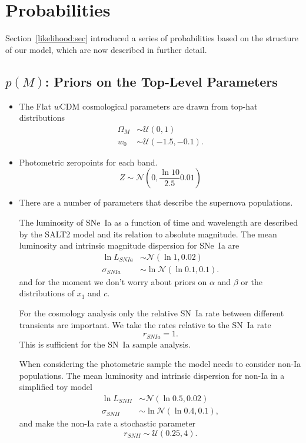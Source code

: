 \documentclass[preprint,3p]{elsarticle}
\begin{document}
\section{Probabilities}
Section~\ref{likelihood:sec} introduced a series of probabilities based on the structure of our model, which are now described
in further detail.

\subsection{$p(M)$: Priors on the Top-Level Parameters}
\begin{itemize}
\item
The Flat $w$CDM cosmological parameters are drawn from top-hat distributions
\begin{align}
\Omega_M & \sim  {\mathcal{U}}(0,1)\\
w_0 & \sim \mathcal{U}(-1.5, -0.1).
\end{align}

\item
Photometric zeropoints for each band.
\begin{equation}
Z \sim \mathcal{N}\left(0,\frac{\ln{10}}{2.5}0.01\right)
\end{equation}


\item
There are a number of parameters that describe the supernova populations.

The luminosity of SNe~Ia as a function of time and wavelength are described by the SALT2 model and
its relation to absolute magnitude.
The mean luminosity and intrinsic magnitude dispersion for SNe~Ia are
\begin{align}
\ln{L}_{SNIa} & \sim \mathcal{N}(\ln{1}, 0.02) \\
\sigma_{SNIa} & \sim \ln{\mathcal{N}}(\ln{0.1},0.1).
\end{align}
and for the moment we don't worry about priors on $\alpha$ and $\beta$ or the distributions of $x_1$ and $c$.

For the cosmology analysis only the relative SN~Ia rate between different transients are important.
We take the rates relative to the SN~Ia rate
\begin{equation}
r_{SNIa} = 1.
\end{equation}
This is sufficient for the SN~Ia sample analysis.

When considering the photometric sample the model needs to consider non-Ia populations.
The mean luminosity and intrinsic dispersion for non-Ia in a simplified toy model
\begin{align}
\ln{L}_{SNII} & \sim \mathcal{N}(\ln{0.5}, 0.02) \\
\sigma_{SNII} & \sim \ln{\mathcal{N}}(\ln{0.4},0.1),
\end{align}
and make the non-Ia rate a stochastic parameter
\begin{equation}
r_{SNII} \sim \mathcal{U}(0.25, 4).
\end{equation}

\end{itemize}
\end{document}
